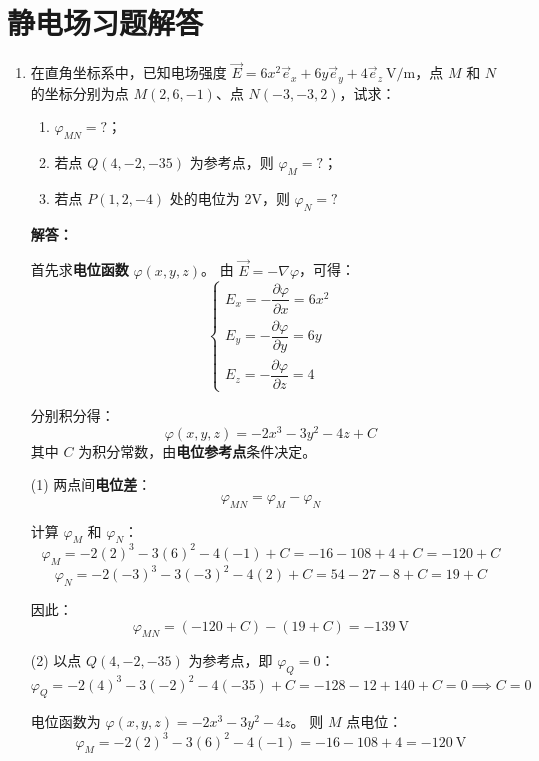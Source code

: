 \section{静电场习题解答}

\begin{enumerate}[label=\arabic*.]
\item 在直角坐标系中，已知电场强度 \(\vec{E} = 6x^2\vec{e}_x + 6y\vec{e}_y + 4\vec{e}_z\ \text{V/m}\)，点 \(M\) 和 \(N\) 的坐标分别为点 \(M(2,6,-1)\)、点 \(N(-3,-3,2)\)，试求：
\begin{enumerate}
    \item \(\varphi_{MN} = ?\)；
    \item 若点 \(Q(4,-2,-35)\) 为参考点，则 \(\varphi_M = ?\)；
    \item 若点 \(P(1,2,-4)\) 处的电位为 2V，则 \(\varphi_N = ?\)
\end{enumerate}

\textbf{解答：}

首先求\textbf{电位函数} \(\varphi(x,y,z)\)。
由 \(\vec{E} = -\nabla\varphi\)，可得：
\[
\begin{cases}
E_x = -\dfrac{\partial \varphi}{\partial x} = 6x^2 \\
E_y = -\dfrac{\partial \varphi}{\partial y} = 6y \\
E_z = -\dfrac{\partial \varphi}{\partial z} = 4
\end{cases}
\]

分别积分得：
\[
\varphi(x,y,z) = -2x^3 - 3y^2 - 4z + C
\]
其中 \(C\) 为积分常数，由\textbf{电位参考点}条件决定。

\vspace{0.5em}
(1) 两点间\textbf{电位差}：
\[
\varphi_{MN} = \varphi_M - \varphi_N
\]

计算 \(\varphi_M\) 和 \(\varphi_N\)：
\[
\varphi_M = -2(2)^3 - 3(6)^2 - 4(-1) + C = -16 - 108 + 4 + C = -120 + C
\]
\[
\varphi_N = -2(-3)^3 - 3(-3)^2 - 4(2) + C = 54 - 27 - 8 + C = 19 + C
\]

因此：
\[
\varphi_{MN} = (-120 + C) - (19 + C) = -139\ \text{V}
\]

\vspace{0.5em}
(2) 以点 \(Q(4,-2,-35)\) 为参考点，即 \(\varphi_Q = 0\)：
\[
\varphi_Q = -2(4)^3 - 3(-2)^2 - 4(-35) + C = -128 - 12 + 140 + C = 0 \implies C=0
\]

电位函数为 \(\varphi(x,y,z) = -2x^3 - 3y^2 - 4z\)。
则 \(M\) 点电位：
\[
\varphi_M = -2(2)^3 - 3(6)^2 - 4(-1) = -16 - 108 + 4 = -120\ \text{V}
\]


\end{enumerate}
